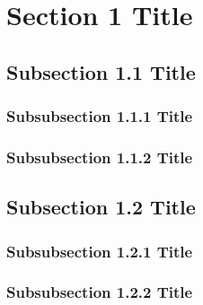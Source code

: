 \section{Section 1 Title}

\subsection{Subsection 1.1 Title}

\subsubsection{Subsubsection 1.1.1 Title}

\subsubsection{Subsubsection 1.1.2 Title}

\subsection{Subsection 1.2 Title}

\subsubsection{Subsubsection 1.2.1 Title}

\subsubsection{Subsubsection 1.2.2 Title}